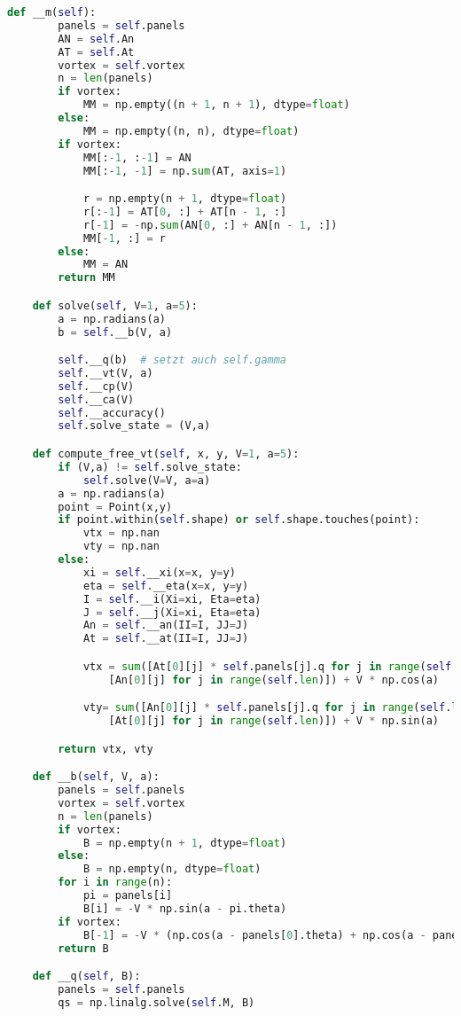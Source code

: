 \begin{lstlisting}[language=Python]
    def __m(self):
        panels = self.panels
        AN = self.An
        AT = self.At
        vortex = self.vortex
        n = len(panels)
        if vortex:
            MM = np.empty((n + 1, n + 1), dtype=float)
        else:
            MM = np.empty((n, n), dtype=float)
        if vortex:
            MM[:-1, :-1] = AN
            MM[:-1, -1] = np.sum(AT, axis=1)

            r = np.empty(n + 1, dtype=float)
            r[:-1] = AT[0, :] + AT[n - 1, :]
            r[-1] = -np.sum(AN[0, :] + AN[n - 1, :])
            MM[-1, :] = r
        else:
            MM = AN
        return MM

    def solve(self, V=1, a=5):
        a = np.radians(a)
        b = self.__b(V, a)

        self.__q(b)  # setzt auch self.gamma
        self.__vt(V, a)
        self.__cp(V)
        self.__ca(V)
        self.__accuracy()
        self.solve_state = (V,a)

    def compute_free_vt(self, x, y, V=1, a=5):
        if (V,a) != self.solve_state:
            self.solve(V=V, a=a)
        a = np.radians(a)
        point = Point(x,y)
        if point.within(self.shape) or self.shape.touches(point):
            vtx = np.nan
            vty = np.nan
        else:
            xi = self.__xi(x=x, y=y)
            eta = self.__eta(x=x, y=y)
            I = self.__i(Xi=xi, Eta=eta)
            J = self.__j(Xi=xi, Eta=eta)
            An = self.__an(II=I, JJ=J)
            At = self.__at(II=I, JJ=J)

            vtx = sum([At[0][j] * self.panels[j].q for j in range(self.len)]) - self.gamma * sum(
                [An[0][j] for j in range(self.len)]) + V * np.cos(a)

            vty= sum([An[0][j] * self.panels[j].q for j in range(self.len)]) + self.gamma * sum(
                [At[0][j] for j in range(self.len)]) + V * np.sin(a)

        return vtx, vty

    def __b(self, V, a):
        panels = self.panels
        vortex = self.vortex
        n = len(panels)
        if vortex:
            B = np.empty(n + 1, dtype=float)
        else:
            B = np.empty(n, dtype=float)
        for i in range(n):
            pi = panels[i]
            B[i] = -V * np.sin(a - pi.theta)
        if vortex:
            B[-1] = -V * (np.cos(a - panels[0].theta) + np.cos(a - panels[-1].theta))
        return B

    def __q(self, B):
        panels = self.panels
        qs = np.linalg.solve(self.M, B)


\end{lstlisting}
